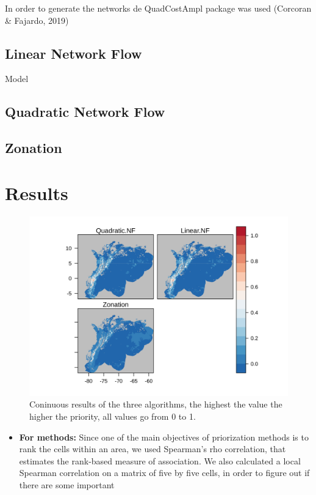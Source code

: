 \documentclass[]{article}
\providecommand{\tightlist}{%
  \setlength{\itemsep}{0pt}\setlength{\parskip}{0pt}}
\begin{document}
In order to generate the networks de QuadCostAmpl package was used (Corcoran \& Fajardo, 2019)

\hypertarget{linear-network-flow}{%
\subsection{Linear Network Flow}\label{linear-network-flow}}

Model

\hypertarget{quadratic-network-flow}{%
\subsection{Quadratic Network Flow}\label{quadratic-network-flow}}

\hypertarget{zonation}{%
\subsection{Zonation}\label{zonation}}

\hypertarget{results}{%
\section*{Results}\label{results}}

\begin{figure}
\centering
\includegraphics{NFPaper_files/figure-latex/AllSols-1.png}
\caption{\label{fig:AllSols}Coninuous results of the three algorithms, the highest the value the higher the priority, all values go from 0 to 1.}
\end{figure}

\begin{itemize}
\tightlist
\item
  \textbf{For methods:} Since one of the main objectives of priorization methods is to rank the cells within an area, we used Spearman's rho correlation, that estimates the rank-based measure of association. We also calculated a local Spearman correlation on a matrix of five by five cells, in order to figure out if there are some important
\end{itemize}
\end{document}
